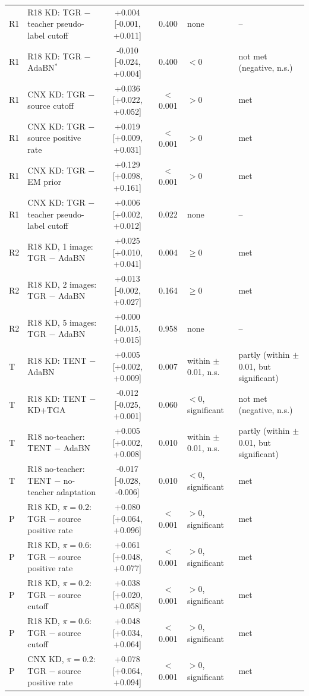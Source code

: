 \begin{table}[htbp]
{\begin{tabular}{@{}l>{\raggedright\arraybackslash}p{5.0cm}ccp{1.8cm}>{\raggedright\arraybackslash}p{2.4cm}@{}}
R1 & R18 KD: TGR $-$ teacher pseudo-label cutoff & +0.004 [-0.001, +0.011] & 0.400 & none & -- \\
R1 & R18 KD: TGR $-$ AdaBN$^\ast$ & -0.010 [-0.024, +0.004] & 0.400 & $<0$ & not met (negative, n.s.) \\
R1 & CNX KD: TGR $-$ source cutoff & +0.036 [+0.022, +0.052] & $<$0.001 & $>0$ & met \\
R1 & CNX KD: TGR $-$ source positive rate & +0.019 [+0.009, +0.031] & $<$0.001 & $>0$ & met \\
R1 & CNX KD: TGR $-$ EM prior & +0.129 [+0.098, +0.161] & $<$0.001 & $>0$ & met \\
R1 & CNX KD: TGR $-$ teacher pseudo-label cutoff & +0.006 [+0.002, +0.012] & 0.022 & none & -- \\
R2 & R18 KD, 1 image: TGR $-$ AdaBN & +0.025 [+0.010, +0.041] & 0.004 & $\ge 0$ & met \\
R2 & R18 KD, 2 images: TGR $-$ AdaBN & +0.013 [-0.002, +0.027] & 0.164 & $\ge 0$ & met \\
R2 & R18 KD, 5 images: TGR $-$ AdaBN & +0.000 [-0.015, +0.015] & 0.958 & none & -- \\
T & R18 KD: TENT $-$ AdaBN & +0.005 [+0.002, +0.009] & 0.007 & within $\pm$0.01, n.s. & partly (within $\pm$0.01, but significant) \\
T & R18 KD: TENT $-$ KD+TGA & -0.012 [-0.025, +0.001] & 0.060 & $<0$, significant & not met (negative, n.s.) \\
T & R18 no-teacher: TENT $-$ AdaBN & +0.005 [+0.002, +0.008] & 0.010 & within $\pm$0.01, n.s. & partly (within $\pm$0.01, but significant) \\
T & R18 no-teacher: TENT $-$ no-teacher adaptation & -0.017 [-0.028, -0.006] & 0.010 & $<0$, significant & met \\
P & R18 KD, $\pi=0.2$: TGR $-$ source positive rate & +0.080 [+0.064, +0.096] & $<$0.001 & $>0$, significant & met \\
P & R18 KD, $\pi=0.6$: TGR $-$ source positive rate & +0.061 [+0.048, +0.077] & $<$0.001 & $>0$, significant & met \\
P & R18 KD, $\pi=0.2$: TGR $-$ source cutoff & +0.038 [+0.020, +0.058] & $<$0.001 & $>0$, significant & met \\
P & R18 KD, $\pi=0.6$: TGR $-$ source cutoff & +0.048 [+0.034, +0.064] & $<$0.001 & $>0$, significant & met \\
P & CNX KD, $\pi=0.2$: TGR $-$ source positive rate & +0.078 [+0.064, +0.094] & $<$0.001 & $>0$, significant & met \\

\end{tabular}}
\end{table}
